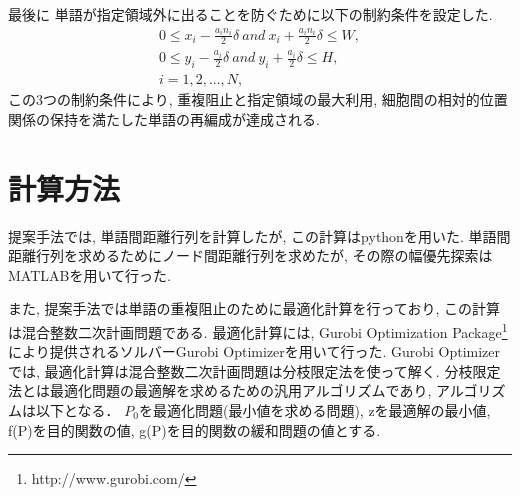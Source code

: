\documentclass[syuuron]{kuee}
\begin{document}
				最後に 単語が指定領域外に出ることを防ぐために以下の制約条件を設定した.
				\begin{eqnarray}
					0 \le x_i  -  \frac{a_i n_i} {2} \delta \:  and \:  x_i  +  \frac{a_i n_i} {2} \delta \le W, \nonumber \\
					0 \le y_i  -  \frac{a_i} {2} \delta  \: and \:  y_i  +  \frac{a_i} {2} \delta \le H ,\\
					i = 1, 2, ...,N, \nonumber
				\end{eqnarray}
				この3つの制約条件により, 重複阻止と指定領域の最大利用, 細胞間の相対的位置関係の保持を満たした単語の再編成が達成される. 
	
	\section{計算方法}
		提案手法では, 単語間距離行列を計算したが, この計算はpythonを用いた. 
		単語間距離行列を求めるためにノード間距離行列を求めたが, その際の幅優先探索はMATLABを用いて行った. 
				
		また, 提案手法では単語の重複阻止のために最適化計算を行っており, この計算は混合整数二次計画問題である. 
		最適化計算には, Gurobi Optimization Package\footnote{http://www.gurobi.com/}により提供されるソルバーGurobi Optimizerを用いて行った.
		Gurobi Optimizerでは, 最適化計算は混合整数二次計画問題は分枝限定法を使って解く. 
		分枝限定法とは最適化問題の最適解を求めるための汎用アルゴリズムであり, アルゴリズムは以下となる．
		$P_0$を最適化問題(最小値を求める問題), zを最適解の最小値, f(P)を目的関数の値, g(P)を目的関数の緩和問題の値とする. 
				
\end{document}
